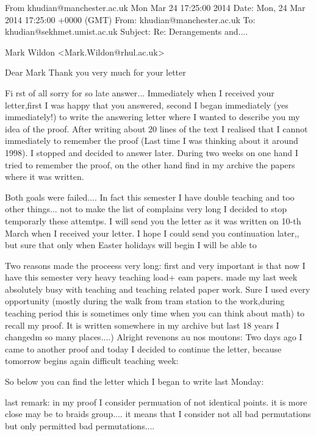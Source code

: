 From khudian@manchester.ac.uk Mon Mar 24 17:25:00 2014
Date: Mon, 24 Mar 2014 17:25:00 +0000 (GMT)
From: khudian@manchester.ac.uk
To: khudian@sekhmet.umist.ac.uk
Subject: Re: Derangements and....



   Mark Wildon <Mark.Wildon@rhul.ac.uk>



   Dear Mark
Thank you very much for your letter

        Fi rst of all sorry  for so late answer...
  Immediately when I received your  letter,first I was happy that you
answered, second I began immediately (yes immediately!) 
to write the answering letter where I 
wanted to describe you my idea of the proof. After writing about 20 lines 
of the  text I realised that I cannot immediately to remember 
the proof (Last time I was thinking about it around 1998).
I stopped and decided to answer 
later. During two weeks on one hand I tried to remember the proof, on
the other hand find in my archive the papers where it was written.

  Both goals were failed.... In fact this semester I have double teaching
and too other things... not to make the list of complains very long
  I decided to stop temporarly these  attemtps.
I will send you the letter as it was written on 10-th March when
I received your letter. I hope I could send you continuation later,,
but sure that only when Easter holidays will begin I will be able to 
 



Two reasons made the proceess very long: first and very important
is that now I have this semester very heavy teaching load+
eam papers. made my last week absolutely busy with teaching and teaching 
related paper work. Sure I used every opportunity (mostly during the walk
from tram station to the work,during teaching period this is
sometimes only time when you can think about math) to recall my proof.
It is written somewhere in my archive but last 18 years I changedm
so many places....) Alright revenons au nos moutons:
Two days ago I came to another proof and today I decided to continue the 
letter, because tomorrow begins again difficult teaching week:

So below you can find the letter which I began to write last Monday:

last remark: in my proof I consider permuation of not identical points.
it is more close may be to braids group....
it means that I consider not all bad permutations but only
permitted bad permutations....


